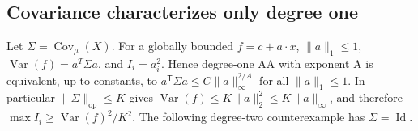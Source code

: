 \subsection{Covariance characterizes only degree
one}\label{proof:higher_order_obstructions:covariance-characterizes-only-degree-one}

Let \(\Sigma=\operatorname{Cov}_\mu(X)\). For a globally bounded
\(f = c+a\cdot x\), \(\lVert a\rVert_{1} \le  1\),
\(\operatorname{Var}(f) = a^{T}\Sigma a\), and \(I_{i} = a_{i}^{2}\).
Hence degree-one AA with exponent A is equivalent, up to constants, to
\(a^{\mathsf T}\Sigma a\le C\lVert a\rVert_\infty^{2/A}\) for all
\(\lVert a\rVert_{1} \le  1\). In particular
\(\lVert\Sigma\rVert_{\mathrm{op}}\le K\) gives
\(\operatorname{Var}(f) \le  K\lVert a\rVert_{2}^{2} \le  K\lVert a\rVert_\infty\),
and therefore \(\max  I_{i} \ge  \operatorname{Var}(f)^{2}/K^{2}\). The
following degree-two counterexample has \(\Sigma  = \operatorname{Id}\).

